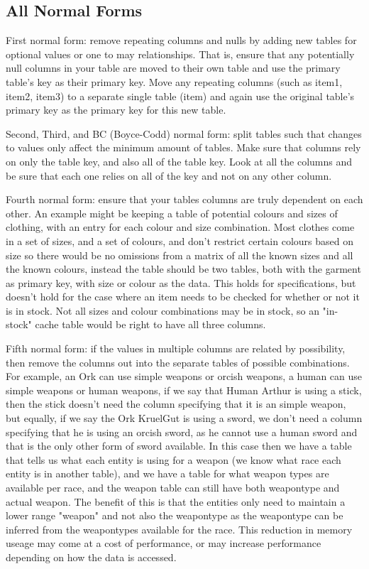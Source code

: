 \subsection{All Normal Forms}

First normal form: remove repeating columns and nulls by adding new tables for
optional values or one to may relationships. That is, ensure that any
potentially null columns in your table are moved to their own table and use the
primary table's key as their primary key. Move any repeating columns (such as
item1, item2, item3) to a separate single table (item) and again use the
original table's primary key as the primary key for this new table.

Second, Third, and BC (Boyce-Codd) normal form: split tables such that changes
to values only affect the minimum amount of tables. Make sure that columns rely
on only the table key, and also all of the table key.  Look at all the columns
and be sure that each one relies on all of the key and not on any other column.

Fourth normal form: ensure that your tables columns are truly dependent on each
other. An example might be keeping a table of potential colours and sizes of
clothing, with an entry for each colour and size combination. Most clothes come
in a set of sizes, and a set of colours, and don't restrict certain colours
based on size so there would be no omissions from a matrix of all the known
sizes and all the known colours, instead the table should be two tables, both
with the garment as primary key, with size or colour as the data. This holds
for specifications, but doesn't hold for the case where an item needs to be
	checked for whether or not it is in stock.  Not all sizes and colour
	combinations may be in stock, so an "in-stock" cache table would be right to
	have all three columns.

Fifth normal form: if the values in multiple columns are related by
possibility, then remove the columns out into the separate tables of possible
combinations. For example, an Ork can use simple weapons or orcish weapons, a
human can use simple weapons or human weapons, if we say that Human Arthur is
using a stick, then the stick doesn't need the column specifying that it is an
simple weapon, but equally, if we say the Ork KruelGut is using a sword, we
don't need a column specifying that he is using an orcish sword, as he cannot
use a human sword and that is the only other form of sword available. In this
case then we have a table that tells us what each entity is using for a weapon
(we know what race each entity is in another table), and we have a table for
what weapon types are available per race, and the weapon table can still have
both weapontype and actual weapon. The benefit of this is that the entities
only need to maintain a lower range "weapon" and not also the weapontype as the
weapontype can be inferred from the weapontypes available for the race. This
reduction in memory useage may come at a cost of performance, or may increase
performance depending on how the data is accessed.

